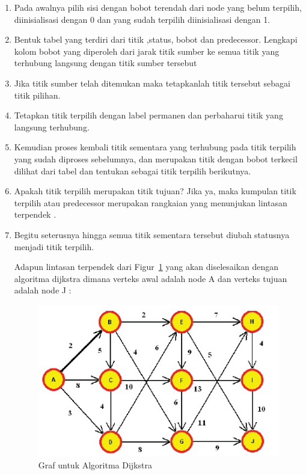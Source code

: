 \begin{enumerate}
\item Pada awalnya pilih sisi dengan bobot terendah dari node yang belum terpilih, diinisialisasi dengan 0 dan yang sudah terpilih diinisialisasi dengan 1.
\item Bentuk tabel yang terdiri dari titik ,status, bobot dan predecessor. Lengkapi kolom bobot yang diperoleh dari jarak titik sumber ke semua titik yang terhubung langsung dengan titik sumber tersebut
\item Jika titik sumber telah ditemukan maka tetapkanlah titik tersebut sebagai titik pilihan.
\item Tetapkan titik terpilih dengan label permanen dan perbaharui titik yang langsung terhubung.
\item Kemudian proses kembali titik sementara yang terhubung pada titik terpilih yang sudah diproses sebelumnya, dan merupakan titik dengan bobot terkecil dilihat dari tabel dan tentukan sebagai titik terpilih berikutnya.
\item Apakah titik terpilih merupakan titik tujuan? Jika ya, maka kumpulan titik terpilih atau predecessor merupakan rangkaian yang menunjukan lintasan terpendek .
\item Begitu seterusnya hingga semua titik sementara tersebut diubah statusnya menjadi titik terpilih.

Adapun lintasan terpendek dari Figur~\ref{fig:Jalur terpendek} yang akan diselesaikan dengan algoritma dijkstra dimana verteks awal adalah node A dan verteks tujuan adalah node J :

\begin{figure}[htbp]
\begin{center}
	\includegraphics[scale=0.8]{fig/sunario-3/Graf.jpg}%
	\caption{Graf untuk Algoritma Dijkstra}%
	\label{fig:Jalur terpendek}%
\end{center}
\end{figure}


\end{enumerate}
